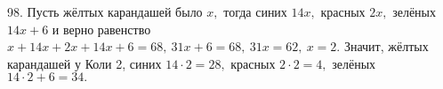 98. Пусть жёлтых карандашей было $x,$ тогда синих $14x,$ красных $2x,$ зелёных $14x+6$ и верно равенство $x+14x+2x+14x+6=68,\ 31x+6=68,\ 31x=62,\ x=2.$ Значит, жёлтых карандашей у Коли 2, синих $14\cdot2=28,$ красных $2\cdot2=4,$ зелёных $14\cdot2+6=34.$\\
